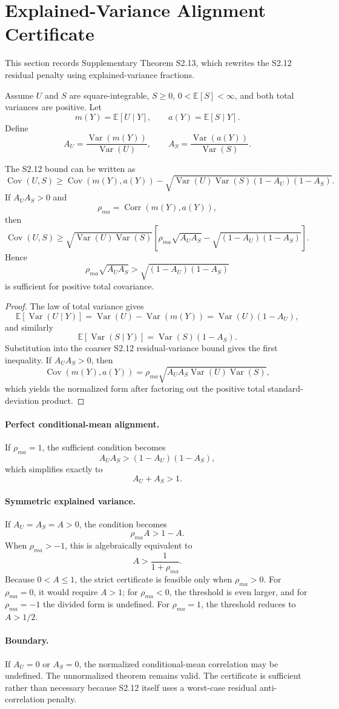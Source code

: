 \section{Explained-Variance Alignment Certificate}

This section records Supplementary Theorem S2.13, which rewrites the S2.12 residual penalty using explained-variance fractions.

Assume $U$ and $S$ are square-integrable, $S\ge0$, $0<\mathbb E[S]<\infty$, and both total variances are positive. Let
\[
m(Y)=\mathbb E[U\mid Y],
\qquad
a(Y)=\mathbb E[S\mid Y].
\]
Define
\[
A_U=
\frac{\operatorname{Var}(m(Y))}{\operatorname{Var}(U)},
\qquad
A_S=
\frac{\operatorname{Var}(a(Y))}{\operatorname{Var}(S)}.
\]

\begin{theorem}
The S2.12 bound can be written as
\[
\operatorname{Cov}(U,S)
\ge
\operatorname{Cov}(m(Y),a(Y))
-
\sqrt{\operatorname{Var}(U)\operatorname{Var}(S)(1-A_U)(1-A_S)}.
\]
If $A_UA_S>0$ and
\[
\rho_{ma}=\operatorname{Corr}(m(Y),a(Y)),
\]
then
\[
\operatorname{Cov}(U,S)
\ge
\sqrt{\operatorname{Var}(U)\operatorname{Var}(S)}
\left[
\rho_{ma}\sqrt{A_UA_S}
-
\sqrt{(1-A_U)(1-A_S)}
\right].
\]
Hence
\[
\rho_{ma}\sqrt{A_UA_S}
>
\sqrt{(1-A_U)(1-A_S)}
\]
is sufficient for positive total covariance.
\end{theorem}

\begin{proof}
The law of total variance gives
\[
\mathbb E[\operatorname{Var}(U\mid Y)]
=
\operatorname{Var}(U)-\operatorname{Var}(m(Y))
=
\operatorname{Var}(U)(1-A_U),
\]
and similarly
\[
\mathbb E[\operatorname{Var}(S\mid Y)]
=
\operatorname{Var}(S)(1-A_S).
\]
Substitution into the coarser S2.12 residual-variance bound gives the first inequality. If $A_UA_S>0$, then
\[
\operatorname{Cov}(m(Y),a(Y))
=
\rho_{ma}
\sqrt{A_UA_S\operatorname{Var}(U)\operatorname{Var}(S)},
\]
which yields the normalized form after factoring out the positive total standard-deviation product.
\end{proof}

\paragraph{Perfect conditional-mean alignment.}
If $\rho_{ma}=1$, the sufficient condition becomes
\[
A_UA_S>(1-A_U)(1-A_S),
\]
which simplifies exactly to
\[
A_U+A_S>1.
\]

\paragraph{Symmetric explained variance.}
If $A_U=A_S=A>0$, the condition becomes
\[
\rho_{ma}A>1-A.
\]
When $\rho_{ma}>-1$, this is algebraically equivalent to
\[
A>\frac{1}{1+\rho_{ma}}.
\]
Because $0<A\le1$, the strict certificate is feasible only when $\rho_{ma}>0$. For $\rho_{ma}=0$, it would require $A>1$; for $\rho_{ma}<0$, the threshold is even larger, and for $\rho_{ma}=-1$ the divided form is undefined. For $\rho_{ma}=1$, the threshold reduces to $A>1/2$.

\paragraph{Boundary.}
If $A_U=0$ or $A_S=0$, the normalized conditional-mean correlation may be undefined. The unnormalized theorem remains valid. The certificate is sufficient rather than necessary because S2.12 itself uses a worst-case residual anti-correlation penalty.
